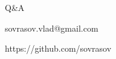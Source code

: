 \documentclass[aspectratio=1610]{beamer}
\begin{document}
\begin{frame}{{}}
  \frametitle{ }
  \begin{center}
    \Large{Q\&A}

\vspace{1cm}

    sovrasov.vlad@gmail.com

    https://github.com/sovrasov
  \end{center}
\end{frame}
\end{document}
